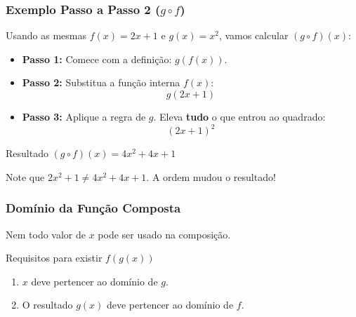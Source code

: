 \documentclass[9pt]{beamer}
\begin{document}
\begin{frame}
\frametitle{Exemplo Passo a Passo 2 ($g \circ f$)}
Usando as mesmas $f(x) = 2x + 1$ e $g(x) = x^2$, vamos calcular $(g \circ f)(x)$:

\begin{itemize}
    \item \textbf{Passo 1:} Comece com a definição: $g(f(x))$.
    \item \textbf{Passo 2:} Substitua a função interna $f(x)$:
    \[ g(2x + 1) \]
    \item \textbf{Passo 3:} Aplique a regra de $g$. Eleva \textbf{tudo} o que entrou ao quadrado:
    \[ (2x + 1)^2 \]
\end{itemize}

\begin{block}{Resultado}
$(g \circ f)(x) = 4x^2 + 4x + 1$
\end{block}
\centering \scriptsize Note que $2x^2+1 \neq 4x^2+4x+1$. A ordem mudou o resultado!
\end{frame}

\begin{frame}
\frametitle{Domínio da Função Composta}
Nem todo valor de $x$ pode ser usado na composição.

\begin{block}{Requisitos para existir $f(g(x))$}
\begin{enumerate}
    \item $x$ deve pertencer ao domínio de $g$.
    \item O resultado $g(x)$ deve pertencer ao domínio de $f$.
\end{enumerate}
\end{block}

\centering
{}
\end{frame}
\end{document}
